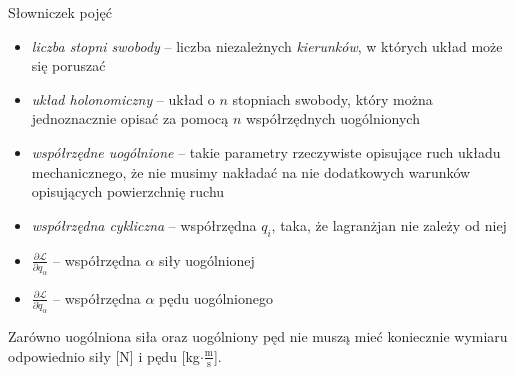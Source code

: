 \documentclass[../main.tex]{subfiles}
\begin{document}
\noindent{}
\medskip

\noindent Słowniczek pojęć
\begin{itemize}
\item \textit{liczba stopni swobody} -- liczba niezależnych \textit{kierunków}, w których układ może się poruszać
    \item \textit{układ holonomiczny} -- układ o \(n\) stopniach swobody, który można jednoznacznie opisać za pomocą \(n\) współrzędnych uogólnionych
    \item \textit{współrzędne uogólnione} -- takie parametry rzeczywiste opisujące ruch układu mechanicznego, że nie musimy nakładać na nie dodatkowych warunków opisujących powierzchnię ruchu
    \item \textit{współrzędna cykliczna} -- współrzędna \(q_i\), taka, że lagranżjan nie zależy od niej
    \item \(\frac{\partial\mathcal{L}}{\partial q_\alpha}\) -- współrzędna \(\alpha\) siły uogólnionej
    \item \(\frac{\partial \mathcal{L}}{\partial \dot{q}_\alpha}\) -- współrzędna \(\alpha\) pędu uogólnionego
\end{itemize}
Zarówno uogólniona siła oraz uogólniony pęd nie muszą mieć koniecznie wymiaru odpowiednio siły [N] i pędu [kg\(\cdot\frac{\text{m}}{\text{s}}\)].
\end{document}

